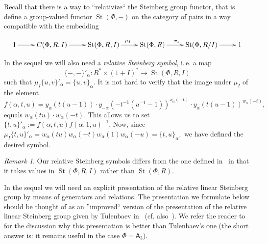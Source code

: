 \documentclass[oneside, 10pt]{amsart}
\DeclareMathOperator{\St}{St}
\newcommand{\rA}{\mathsf{A}}
\newcommand{\ext}[1]{\mu_{#1}}           %
\numberwithin{equation}{section}
\numberwithin{lemma}{section}
\theoremstyle{definition}
\theoremstyle{remark}
\newtheorem{rem}[lemma]{Remark}
\begin{document}
Recall that there is a way to ``relativize`` the Steinberg group functor, that is define a group-valued functor $\St(\Phi, -)$ on the category of pairs
 in a way compatible with the embedding 

\begin{equation}
 \xymatrix{ 1 \ar[r] & C(\Phi, R, I) \ar[r] & \St(\Phi, R, I) \ar[r]^{\ext{I}} & \St(\Phi, R) \ar[r]^{\pi_*} & \St(\Phi, R/I) \ar[r] & 1 }
\end{equation}

In the sequel we will also need a {\it relative Steinberg symbol}, i.\,e. a map
\begin{equation*} \{-, -\}'_\alpha \colon R^* \times (1 + I)^* \to \St(\Phi, R, I) \end{equation*}
such that $ \ext{I} \{u, v\}'_\alpha = \{u, v\}_\alpha$. It is not hard to verify that the image under $\mu_I$ of the element
\begin{equation*} f(\alpha, t, u)= y_\alpha(t(u-1)) \cdot y_{-\alpha}(-t^{-1}(u^{-1}-1))^{x_\alpha(-t)} \cdot y_{\alpha}(t(u-1))^{w_\alpha(-t)}, \end{equation*}
equals $w_\alpha(tu) \cdot w_\alpha(-t)$. This allows us to set $\{t, u \}'_\alpha := f(\alpha, t, u) f(\alpha, 1, u)^{-1}.$
Now, since $\mu_I\{ t, u \}'_\alpha = w_\alpha(tu) w_\alpha(-t) w_\alpha(1) w_\alpha(-u) = \{t, u\}_\alpha,$ 
 we have defined the desired symbol.
\begin{rem}
 Our relative Steinberg symbols differs from the one defined in~\cite{Ste73} in that
  it takes values in $\St(\Phi, R, I)$ rather than $\St(\Phi, R)$. %
\end{rem}

In the sequel we will need an explicit presentation of the relative linear Steinberg group by means of generators and relations.
The presentation we formulate below should be thought of as an ''improved`` version of the presentation of the relative linear Steinberg group
 given by Tulenbaev in~\cite[Definition~1.5]{Tu83} (cf. also~\cite[Proposition~3.2]{LS17}).
We refer the reader to~\cite[Section~3]{LS17} for the discussion why this presentation is better than Tulenbaev's one
 (the short answer is: it remains useful in the case $\Phi = \rA_3$).
\end{document}
